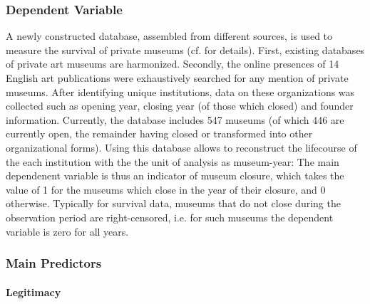 \documentclass[12pt]{article}
\begin{document}
\subsubsection*{Dependent Variable}

A newly constructed database, assembled from different sources,  is used to measure the survival of private museums (cf. \textcite{Velthuis_etal_2023_boom} for details).
First, existing databases of private art museums are harmonized.
Secondly, the online presences of 14 English art publications were exhaustively searched for any mention of private museums.
After identifying unique institutions, data on these organizations was collected such as opening year, closing year (of those which closed) and founder information.
Currently, the database includes 547 museums (of which 446 are currently open, the remainder having closed or transformed into other organizational forms).
Using this database allows to reconstruct the lifecourse of the each institution with the the unit of analysis as museum-year:
The main dependenent variable is thus an indicator of museum closure, which takes the value of 1 for the museums which close in the year of their closure, and 0 otherwise.
Typically for survival data, museums that do not close during the observation period are right-censored, i.e. for such museums the dependent variable is zero for all years.


\subsubsection*{Main Predictors}



\paragraph*{Legitimacy}
\end{document}
